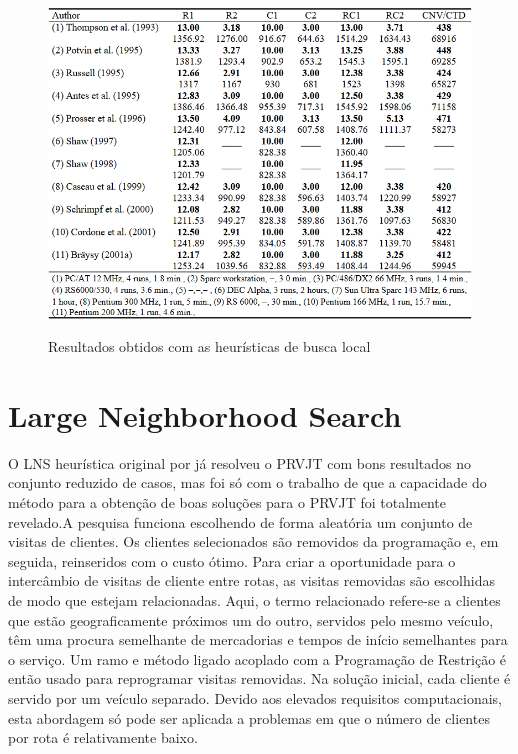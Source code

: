 \begin{figure}[ht!]
	\centering
	\includegraphics[scale=0.7]{figuras/rbl.PNG}
	\label{rbl}
	\caption{Resultados obtidos com as heurísticas de busca local}
\end{figure}


\section{Large Neighborhood Search}


 O LNS heurística original por \cite{shaw98} já resolveu o PRVJT com bons resultados no conjunto reduzido de casos, mas foi só com o trabalho de \cite{bent04} que a capacidade do método para a obtenção de boas soluções para o PRVJT foi totalmente revelado.A pesquisa funciona escolhendo de forma aleatória um conjunto de visitas de clientes. Os clientes selecionados são removidos da programação e, em seguida, reinseridos com o custo ótimo. Para criar a oportunidade para o intercâmbio de visitas de cliente entre rotas, as visitas removidas são escolhidas de modo que estejam relacionadas. Aqui, o termo relacionado refere-se a clientes que estão geograficamente próximos um do outro, servidos pelo mesmo veículo, têm uma procura semelhante de mercadorias e tempos de início semelhantes para o serviço. Um ramo e método ligado acoplado com a Programação de Restrição é então usado para reprogramar visitas removidas. Na solução inicial, cada cliente é servido por um veículo separado. Devido aos elevados requisitos computacionais, esta abordagem só pode ser aplicada a problemas em que o número de clientes por rota é relativamente baixo.
 
